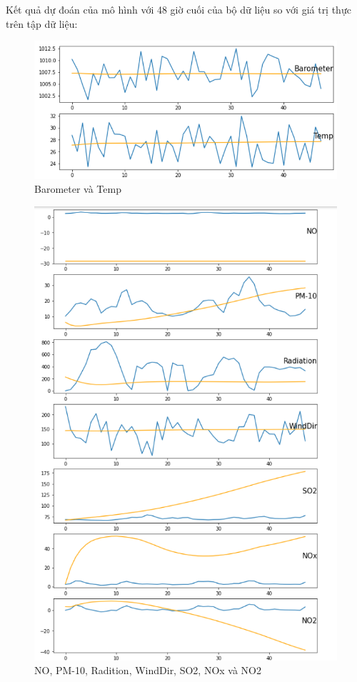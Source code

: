 Kết quả dự đoán của mô hình với 48 giờ cuối của bộ dữ liệu so với giá trị thực trên tập dữ liệu:
    \begin{figure}[H]
    \centering
    \includegraphics[width=1\textwidth]{figures/LSTM_test1.png}
    \caption[Barometer và Temp]{Barometer và Temp}
\end{figure}
\newpage
\begin{figure}[H]
    \centering
    \includegraphics[width=.95\textwidth]{figures/LSTM_test3.png}
    \caption[NO, PM-10, Radition, WindDir và SO2]{NO, PM-10, Radition, WindDir, SO2, NOx và NO2}
\end{figure}
